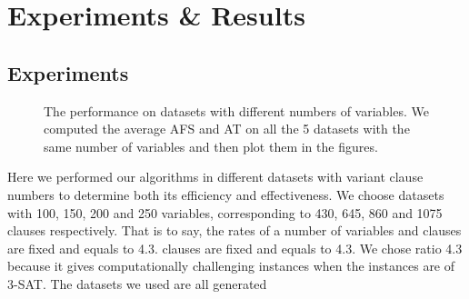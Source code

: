 
\section{Experiments \& Results}
\subsection{Experiments}
\begin{figure}[htbp]
	\centering
	\caption{The performance on datasets with different numbers of variables. We computed
		the average AFS and AT on all the 5 datasets with the same number of variables
		and then plot them in the figures.}
	\label{fig:performance}
\end{figure}
Here we performed our algorithms in different datasets with variant clause
numbers to determine both its efficiency and effectiveness. We choose datasets
with 100, 150, 200 and 250 variables, corresponding to 430, 645, 860 and 1075
clauses respectively. That is to say, the rates of a number of variables and
clauses are fixed and equals to 4.3. clauses are fixed and equals to 4.3. We chose ratio 4.3 because it gives computationally challenging instances when the instances are of 3-SAT\parencite{BenchmarksRatio}. The datasets we used are all generated
